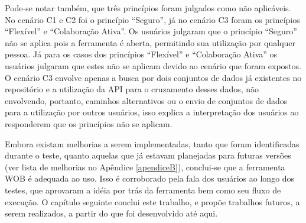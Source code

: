 Pode-se notar também, que três princípios foram julgados como não aplicáveis. No cenário 
C1 e C2 foi o princípio “Seguro”, já no cenário C3 foram os princípios “Flexível” e 
“Colaboração Ativa”. Os usuários julgaram que o princípio “Seguro” não se aplica pois a 
ferramenta é aberta, permitindo sua utilização por qualquer pessoa. Já para os casos dos 
princípios “Flexível” e “Colaboração Ativa” os usuários julgaram que estes não se aplicam 
devido ao cenário que foram expostos. O cenário C3 envolve apenas a busca por dois 
conjuntos de dados já existentes no repositório e a utilização da API para o cruzamento 
desses dados, não envolvendo, portanto, caminhos alternativos ou o envio de conjuntos de 
dados para a utilização por outros usuários, isso explica a interpretação dos usuários 
ao responderem que os princípios não se aplicam.

Embora existam melhorias a serem implementadas, tanto que foram identificadas durante o 
teste, quanto aquelas que já estavam planejadas para futuras versões (ver lista de 
melhorias no Apêndice \ref{apendiceB}), conclui-se que a ferramenta WOB é adequada ao uso. 
Isso é corroborado pela fala dos usuários ao longo dos testes, que aprovaram a idéia por trás
da ferramenta bem como seu fluxo de execução. O capítulo seguinte conclui este trabalho, e 
propõe trabalhos futuros, a serem realizados, a partir do que foi desenvolvido até aqui.
